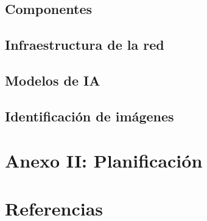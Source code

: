 \documentclass[10pt,a4paper,titlepage]{report}
\begin{document}
	\section{Componentes}

	\section{Infraestructura de la red}
		
	
	\section{Modelos de IA}	

	\section{Identificación de imágenes}
	
\chapter{Anexo II: Planificación}

\chapter{Referencias}
\end{document}
